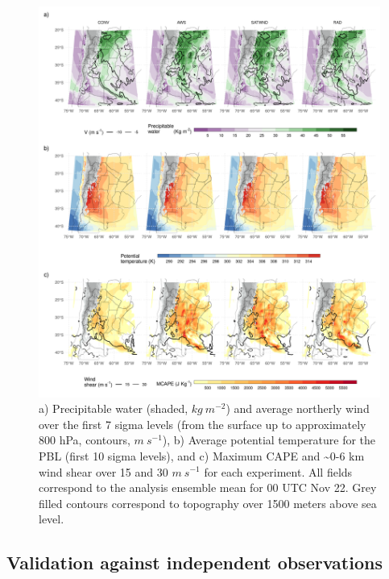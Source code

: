 \documentclass[final,5p,times,twocolumn,authoryear]{elsarticle} %
\begin{document}
\begin{figure}
\includegraphics[width=1\linewidth]{../figures/summary-fields-1} \caption{a) Precipitable water (shaded, \(kg\ m^{-2}\)) and average northerly wind over the first 7 sigma levels (from the surface up to approximately 800 hPa, contours, \(m\ s^{-1}\)), b) Average potential temperature for the PBL (first 10 sigma levels), and c) Maximum CAPE and \textasciitilde0-6 km wind shear over 15 and 30 \(m\ s^{-1}\) for each experiment. All fields correspond to the analysis ensemble mean for 00 UTC Nov 22. Grey filled contours correspond to topography over 1500 meters above sea level.}\label{fig:summary-fields}
\end{figure}

\hypertarget{validation-against-independent-observations}{%
\subsection{Validation against independent observations}\label{validation-against-independent-observations}}
\end{document}
